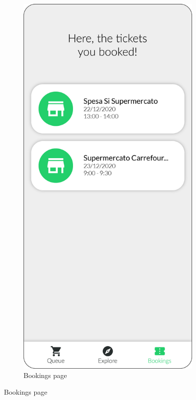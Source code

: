 \begin{figure}[H]
\begin{subfigure}[t]{0.28\textwidth}
    \end{subfigure}
    \quad
    \begin{subfigure}[t]{0.28\textwidth} 
        \includegraphics{../mockups/bookings}
        \caption*{Bookings page}

\end{subfigure}
\end{figure}
